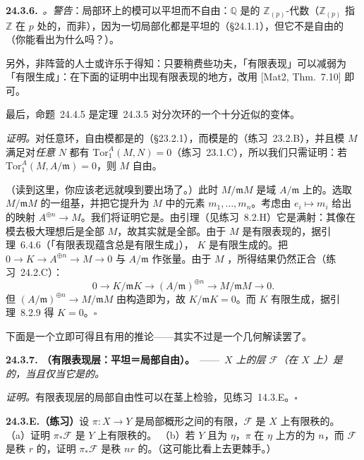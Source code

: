 \textbf{24.3.6.}\ \emph{\trhRemark。}\quad \emph{警告}：局部环上的模可以平坦而不自由：$\mathbb{Q}$ 是\trFlat{}的 $\mathbb{Z}_{(p)}$-代数（$\mathbb{Z}_{(p)}$ 指 $\mathbb{Z}$ 在 $p$ 处的\trLocalization，而非\trPadics），因为一切局部化都是平坦的（\S24.1.1），但它不是自由的（你能看出为什么吗？）。

另外，非\trNoether{}阵营的人士或许乐于得知：只要稍费些功夫，「有限表现」可以减弱为「有限生成」：在下面的证明中出现有限表现的地方，改用 [Mat2, Thm.~7.10] 即可。

最后，\mbox{命题~24.4.5} 是\mbox{定理~24.3.5} 对分次环的一个十分近似的变体。

\emph{证明。}\quad 对任意环，自由模都是\trProjectiveObj{}的（\S23.2.1），而\trProjectiveObj{}模是\trFlat{}的（\mbox{练习~23.2.B}），并且\trFlat{}模 $M$ 满足对\emph{任意} $N$ 都有 $\mathrm{Tor}^A_1(M,N)=0$（\mbox{练习~23.1.C}），所以我们只需证明：若 $\mathrm{Tor}^A_1(M,A/\mathfrak{m})=0$，则 $M$ 自由。

（读到这里，你应该老远就嗅到\trNakayama{}要出场了。）此时 $M/\mathfrak{m}M$ 是域 $A/\mathfrak{m}$ 上的\trFiniteDimensional{}\trVectorSpace。选取 $M/\mathfrak{m}M$ 的一组基，并把它提升为 $M$ 中的元素 $m_1,\dots,m_n$。考虑由 $e_i\mapsto m_i$ 给出的映射 $A^{\oplus n}\to M$。我们将证明它是\trIsomorphism。由\trNakayama{}引理（见\mbox{练习~8.2.H}）它是满射：其像在模去极大理想后是全部 $M$，故其实就是全部。由于 $M$ 是有限表现的，据\mbox{引理~6.4.6}（「有限表现蕴含总是有限生成」），\trKernel{} $K$ 是有限生成的。把 $0\to K\to A^{\oplus n}\to M\to 0$ 与 $A/\mathfrak{m}$ 作张量。由于 $M$ \trFlat，所得结果仍然正合（\mbox{练习~24.2.C}）：
\[
0 \longrightarrow K/\mathfrak{m}K \longrightarrow (A/\mathfrak{m})^{\oplus n} \longrightarrow M/\mathfrak{m}M \longrightarrow 0.
\]
但 $(A/\mathfrak{m})^{\oplus n}\to M/\mathfrak{m}M$ 由构造即为\trIsomorphism，故 $K/\mathfrak{m}K=0$。而 $K$ 有限生成，据\trNakayama{}引理~8.2.9 得 $K=0$。\hfill$\square$

下面是一个立即可得且有用的推论——其实不过是一个几何解读罢了。

\textbf{24.3.7. \trhCorollary（有限表现层：平坦＝局部自由）。}\ ——\ \emph{$X$ 上的\trFinitelyPresented{}层 $\mathscr{F}$（在 $X$ 上）是\trFlat{}的，当且仅当它是\trLocallyFree{}的。}

\emph{证明。}\quad 有限表现层的局部自由性可以在茎上检验，见\mbox{练习~14.3.E}。\hfill$\square$

\textbf{24.3.E.（练习）}\quad 设 $\pi\colon X\to Y$ 是局部\trNoether{}概形之间的有限\trFlat{}\trMorphism，$\mathscr{F}$ 是 $X$ 上有限秩的\trLocallyFreeSheaf。
（a）证明 $\pi_\ast\mathscr{F}$ 是 $Y$ 上有限秩的\trLocallyFreeSheaf。
（b）若 $Y$ \trIrreducible{}且\trGenericPoint{}为 $\eta$，$\pi$ 在 $\eta$ 上方的\trDegree{}为 $n$，而 $\mathscr{F}$ 是秩 $r$ 的\trLocallyFreeSheaf，证明 $\pi_\ast\mathscr{F}$ 是秩 $nr$ 的\trLocallyFreeSheaf。（这可能比看上去更棘手。）

